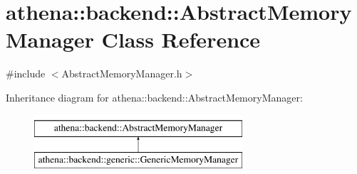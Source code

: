 \hypertarget{classathena_1_1backend_1_1_abstract_memory_manager}{}\section{athena\+:\+:backend\+:\+:Abstract\+Memory\+Manager Class Reference}
\label{classathena_1_1backend_1_1_abstract_memory_manager}


{\ttfamily \#include $<$Abstract\+Memory\+Manager.\+h$>$}

Inheritance diagram for athena\+:\+:backend\+:\+:Abstract\+Memory\+Manager\+:\begin{figure}[H]
\begin{center}
\leavevmode
\includegraphics[height=2.000000cm]{d2/df1/classathena_1_1backend_1_1_abstract_memory_manager}
\end{center}
\end{figure}
